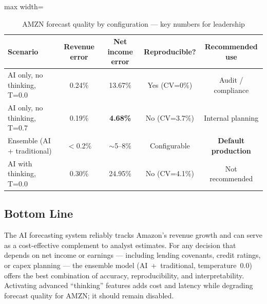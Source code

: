 \documentclass[11pt,a4paper]{article}
\begin{document}
\begin{table}[H]\centering
\caption{AMZN forecast quality by configuration --- key numbers for leadership}
\label{tab:amzn_exec}
\begin{adjustbox}{max width=\textwidth}
\begin{tabular}{lcccc}\toprule
\textbf{Scenario} & \textbf{Revenue error} & \textbf{Net income error} &
\textbf{Reproducible?} & \textbf{Recommended use}\\\midrule
\rowcolor{bestgreen}
AI only, no thinking, T=0.0 & 0.24\% & 13.67\% & Yes (CV=0\%) &
  Audit / compliance\\
\rowcolor{midyellow}
AI only, no thinking, T=0.7 & 0.19\% & \textbf{4.68\%}  & No (CV=3.7\%) &
  Internal planning\\
\rowcolor{bestgreen}
Ensemble (AI + traditional)  & $<$0.2\%  & $\sim$5--8\%   & Configurable &
  \textbf{Default production}\\
\rowcolor{badred}
AI with thinking, T=0.0     & 0.30\% & 24.95\% & No (CV=4.1\%) &
  Not recommended\\
\bottomrule
\end{tabular}
\end{adjustbox}
\end{table}

\subsection*{Bottom Line}

The AI forecasting system reliably tracks Amazon's revenue growth and can
serve as a cost-effective complement to analyst estimates.  For any
decision that depends on net income or earnings --- including lending
covenants, credit ratings, or capex planning --- the ensemble model
(AI~+~traditional, temperature~0.0) offers the best combination of
accuracy, reproducibility, and interpretability.  Activating advanced
``thinking'' features adds cost and latency while degrading forecast quality
for AMZN; it should remain disabled.
\end{document}
